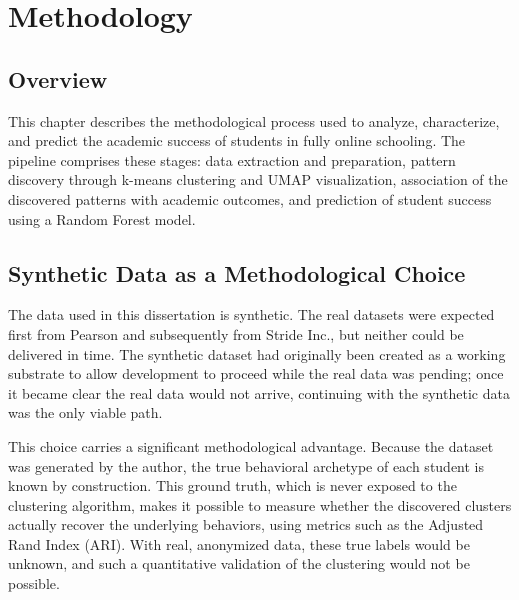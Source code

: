 \chapter{Methodology}
\label{chap:methodology}


\section{Overview}
\label{sec:methodology-overview}
This chapter describes the methodological process used to analyze, characterize, and predict the academic success of students in fully online schooling.
The pipeline comprises these stages: data extraction and preparation, pattern discovery through k-means clustering and UMAP visualization, association of the discovered patterns with academic outcomes, and prediction of student success using a Random Forest model.

\section{Synthetic Data as a Methodological Choice}
\label{sec:synthetic-data-rationale}
The data used in this dissertation is synthetic. The real datasets were expected first from Pearson and subsequently from Stride Inc., but neither could be delivered in time. The synthetic dataset had originally been created as a working substrate to allow development to proceed while the real data was pending; once it became clear the real data would not arrive, continuing with the synthetic data was the only viable path.

This choice carries a significant methodological advantage. Because the dataset was generated by the author, the true behavioral archetype of each student is known by construction. This ground truth, which is never exposed to the clustering algorithm, makes it possible to measure whether the discovered clusters actually recover the underlying behaviors, using metrics such as the Adjusted Rand Index (ARI). With real, anonymized data, these true labels would be unknown, and such a quantitative validation of the clustering would not be possible.

